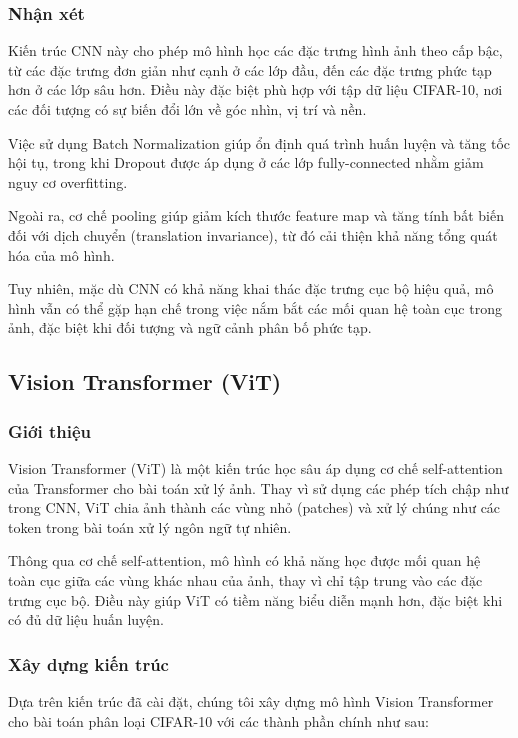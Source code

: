 \subsubsection{Nhận xét}

Kiến trúc CNN này cho phép mô hình học các đặc trưng hình ảnh theo cấp bậc, từ các đặc trưng đơn giản như cạnh ở các lớp đầu, đến các đặc trưng phức tạp hơn ở các lớp sâu hơn. Điều này đặc biệt phù hợp với tập dữ liệu CIFAR-10, nơi các đối tượng có sự biến đổi lớn về góc nhìn, vị trí và nền.

Việc sử dụng Batch Normalization giúp ổn định quá trình huấn luyện và tăng tốc hội tụ, trong khi Dropout được áp dụng ở các lớp fully-connected nhằm giảm nguy cơ overfitting.

Ngoài ra, cơ chế pooling giúp giảm kích thước feature map và tăng tính bất biến đối với dịch chuyển (translation invariance), từ đó cải thiện khả năng tổng quát hóa của mô hình.

Tuy nhiên, mặc dù CNN có khả năng khai thác đặc trưng cục bộ hiệu quả, mô hình vẫn có thể gặp hạn chế trong việc nắm bắt các mối quan hệ toàn cục trong ảnh, đặc biệt khi đối tượng và ngữ cảnh phân bố phức tạp.

\subsection{Vision Transformer (ViT)}

\subsubsection{Giới thiệu}

Vision Transformer (ViT) là một kiến trúc học sâu áp dụng cơ chế self-attention của Transformer cho bài toán xử lý ảnh. Thay vì sử dụng các phép tích chập như trong CNN, ViT chia ảnh thành các vùng nhỏ (patches) và xử lý chúng như các token trong bài toán xử lý ngôn ngữ tự nhiên.

Thông qua cơ chế self-attention, mô hình có khả năng học được mối quan hệ toàn cục giữa các vùng khác nhau của ảnh, thay vì chỉ tập trung vào các đặc trưng cục bộ. Điều này giúp ViT có tiềm năng biểu diễn mạnh hơn, đặc biệt khi có đủ dữ liệu huấn luyện.

\subsubsection{Xây dựng kiến trúc}

Dựa trên kiến trúc đã cài đặt, chúng tôi xây dựng mô hình Vision Transformer cho bài toán phân loại CIFAR-10 với các thành phần chính như sau:

